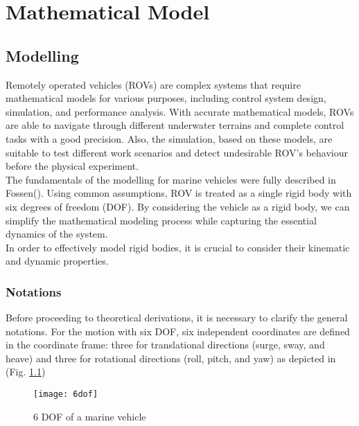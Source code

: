 \chapter{Mathematical Model}
\label{chap:mat}



\section{Modelling}

    Remotely operated vehicles (ROVs) are complex systems that require mathematical models for various purposes, 
    including control system design, simulation, and performance analysis. With accurate mathematical models, 
    ROVs are able to navigate through different underwater terrains and complete control tasks with a good 
    precision. Also, the simulation, based on these models, are suitable to test different work scenarios and 
    detect undesirable ROV's behaviour before the physical experiment. \\    
    
    The fundamentals of the modelling for marine vehicles were fully described in Fossen().
    Using common assumptions, ROV is treated as a single rigid body with six degrees of freedom (DOF).
    By considering the vehicle as a rigid body, we can simplify the mathematical modeling process while capturing the essential dynamics 
    of the system. \\

    In order to effectively model rigid bodies, it is crucial to consider their kinematic and dynamic properties.\\

    \subsection{Notations}


    Before proceeding to theoretical derivations, it is necessary to clarify the general notations.
    For the motion with six DOF, six independent coordinates are defined in the coordinate frame: 
    three for translational directions (surge, sway, and heave) and three for rotational directions 
    (roll, pitch, and yaw) as depicted in (Fig. \ref{image:6dof})

    \begin{figure}[H]
        \centering\texttt{[image: 6dof]}
        \caption{6 DOF of a marine vehicle}
        \label{image:6dof}
    \end{figure}


